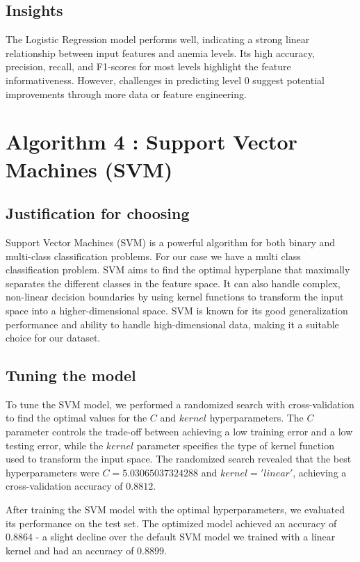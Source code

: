 \subsection{Insights}

The Logistic Regression model performs well, indicating a strong linear relationship between input features and anemia levels. Its high accuracy, precision, recall, and F1-scores for most levels highlight the feature informativeness. However, challenges in predicting level 0 suggest potential improvements through more data or feature engineering.
\section{Algorithm 4 : Support Vector Machines (SVM)}

\subsection{Justification for choosing}

Support Vector Machines (SVM) is a powerful algorithm for both binary and multi-class classification problems. For our case we have a multi class classification problem. SVM aims to find the optimal hyperplane that maximally separates the different classes in the feature space. It can also handle complex, non-linear decision boundaries by using kernel functions to transform the input space into a higher-dimensional space. SVM is known for its good generalization performance and ability to handle high-dimensional data, making it a suitable choice for our dataset.


\subsection{Tuning the model}

To tune the SVM model, we performed a randomized search with cross-validation to find the optimal values for the $C$ and $kernel$ hyperparameters. The $C$ parameter controls the trade-off between achieving a low training error and a low testing error, while the $kernel$ parameter specifies the type of kernel function used to transform the input space. The randomized search revealed that the best hyperparameters were $C=5.03065037324288$ and $kernel='linear'$, achieving a cross-validation accuracy of $0.8812$.

After training the SVM model with the optimal hyperparameters, we evaluated its performance on the test set. The optimized model achieved an accuracy of $0.8864$ - a slight decline over the default SVM model we trained with a linear kernel and had an accuracy of $0.8899$.


